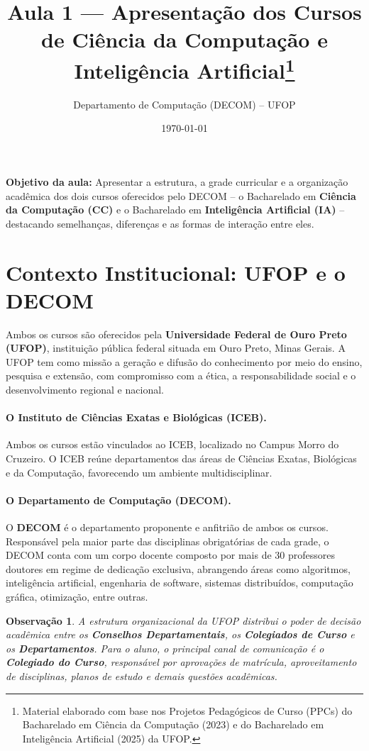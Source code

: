 \documentclass[9pt,a4paper]{extarticle}
\title{Aula 1 --- Apresentação dos Cursos de Ciência da Computação e Inteligência Artificial\footnote{Material elaborado com base nos Projetos Pedagógicos de Curso (PPCs) do Bacharelado em Ciência da Computação (2023) e do Bacharelado em Inteligência Artificial (2025) da UFOP.}}
\author{Departamento de Computação (DECOM) -- UFOP}
\date{\today}
\newcommand{\impt}[1]{\textcolor{important}{\textbf{#1}}}
\newcommand{\cc}[1]{\textcolor{cccolor}{\textbf{#1}}}
\newcommand{\ia}[1]{\textcolor{iacolor}{\textbf{#1}}}
\newtheorem{remark}{Observação}[section]
\begin{document}
\maketitle
\tableofcontents

\bigskip
\noindent\colorbox{shadegray}{\parbox{\dimexpr\linewidth-2\fboxsep}{%
\textbf{Objetivo da aula:} Apresentar a estrutura, a grade curricular e a organização acadêmica dos dois cursos oferecidos pelo DECOM -- o Bacharelado em \cc{Ciência da Computação (CC)} e o Bacharelado em \ia{Inteligência Artificial (IA)} -- destacando semelhanças, diferenças e as formas de interação entre eles.
}}

\section{Contexto Institucional: UFOP e o DECOM}

Ambos os cursos são oferecidos pela \textbf{Universidade Federal de Ouro Preto (UFOP)}, instituição pública federal situada em Ouro Preto, Minas Gerais. A UFOP tem como missão a geração e difusão do conhecimento por meio do ensino, pesquisa e extensão, com compromisso com a ética, a responsabilidade social e o desenvolvimento regional e nacional.

\paragraph{O Instituto de Ciências Exatas e Biológicas (ICEB).}
Ambos os cursos estão vinculados ao ICEB, localizado no Campus Morro do Cruzeiro. O ICEB reúne departamentos das áreas de Ciências Exatas, Biológicas e da Computação, favorecendo um ambiente multidisciplinar.

\paragraph{O Departamento de Computação (DECOM).}
O \impt{DECOM} é o departamento proponente e anfitrião de ambos os cursos. Responsável pela maior parte das disciplinas obrigatórias de cada grade, o DECOM conta com um corpo docente composto por mais de 30 professores doutores em regime de dedicação exclusiva, abrangendo áreas como algoritmos, inteligência artificial, engenharia de software, sistemas distribuídos, computação gráfica, otimização, entre outras.

\begin{remark}
A estrutura organizacional da UFOP distribui o poder de decisão acadêmica entre os \textbf{Conselhos Departamentais}, os \textbf{Colegiados de Curso} e os \textbf{Departamentos}. Para o aluno, o principal canal de comunicação é o \textbf{Colegiado do Curso}, responsável por aprovações de matrícula, aproveitamento de disciplinas, planos de estudo e demais questões acadêmicas.
\end{remark}
\end{document}
